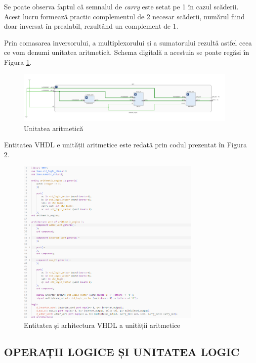 \documentclass[12pt]{article}
\begin{document}
Se poate observa faptul că semnalul de \textit{carry} este setat pe 1 în cazul scăderii. Acest lucru formează practic complementul de 2 necesar scăderii, numărul fiind doar inversat în prealabil, rezultând un complement de 1.

Prin comasarea inversorului, a multiplexorului și a sumatorului rezultă astfel ceea ce vom denumi unitatea aritmetică. Schema digitală a acestuia se poate regăsi în Figura \ref{Figura:19}.

 \begin{figure}[h!]
 \includegraphics[width=0.96\textwidth]{ArithmeticEngine.png}
 \centering
 \caption{Unitatea aritmetică}
 \label{Figura:19}
 \end{figure}
 
Entitatea VHDL e unității aritmetice este redată prin codul prezentat în Figura \ref{Figura:60}.
 
 \begin{figure}[h!]
 \includegraphics[width=0.8\textwidth]{arithmeticengineVHDL.png}
 \centering
 \caption{Entitatea și arhitectura VHDL a unității aritmetice}
 \label{Figura:60}
 \end{figure} 
 
 \subsection{OPERAȚII LOGICE ȘI UNITATEA LOGIC}
 
\end{document}
